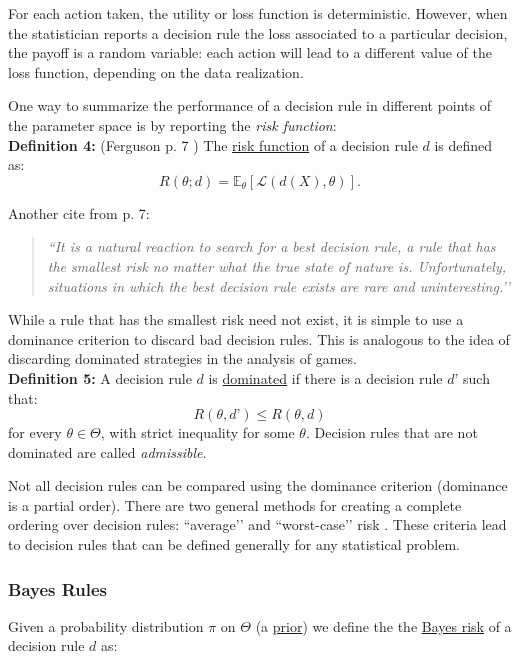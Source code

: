 \documentclass[11pt]{article} %
\begin{document}
For each action taken, the utility or loss function is deterministic. However, when the statistician reports a decision rule the loss associated to a particular decision, the payoff is a random variable: each action will lead to a different value of the loss function, depending on the data realization. 

One way to summarize the performance of a decision rule in different points of the parameter space is by reporting the \emph{risk function}: \\

\noindent \textbf{Definition 4:} (Ferguson p. 7 ) The \underline{risk function} of a decision rule $d$ is defined as:
\[ R(\theta; d) = \mathbb{E}_{\theta}[\mathcal{L}(d(X),\theta)]. \]

\noindent Another cite from \cite{Ferguson67} p. 7:

\begin{quote}
\emph{``It is a natural reaction to search for a best decision rule, a rule that has the smallest risk no matter what the true state of nature is. Unfortunately, situations in which the best decision rule exists are rare and uninteresting.’’}
\end{quote}

\noindent While a rule that has the smallest risk need not exist, it is simple to use a dominance criterion to discard bad decision rules. This is analogous to the idea of discarding dominated strategies in the analysis of games. \\ 

\noindent \textbf{Definition 5:} A decision rule $d$ is \underline{dominated} if there is a decision rule $d’$ such that:
\[R(\theta,d’) \leq R(\theta,d)\]
for every $\theta \in \Theta$, with strict inequality for some $\theta$. Decision rules that are not dominated are called \emph{admissible}.  

Not all decision rules can be compared using the dominance criterion (dominance is a partial order). There are two general methods for creating a complete ordering over decision rules: ``average’’ and ``worst-case’’ risk . These criteria lead to decision rules that can be defined generally for any statistical problem. 


\subsubsection{Bayes Rules} 

Given a probability distribution $\pi$ on $\Theta$ (a \underline{prior}) we define the the \underline{Bayes risk} of a decision rule $d$ as:
\end{document}
